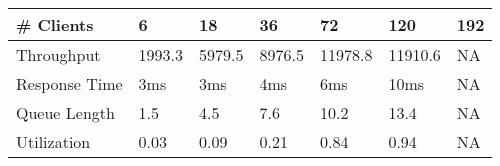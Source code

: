 \begin{tabular}{lllllll}
\hline
\# Clients & 6 & 18 & 36 & 72 & 120 & 192\\
\hline
Throughput & 1993.3 & 5979.5 & 8976.5 & 11978.8 & 11910.6 & NA\\
Response Time & 3ms & 3ms & 4ms & 6ms & 10ms & NA\\
Queue Length & 1.5 & 4.5 & 7.6 & 10.2 & 13.4 & NA\\
Utilization & 0.03 & 0.09 & 0.21 & 0.84 & 0.94 & NA\\
\hline
\end{tabular}